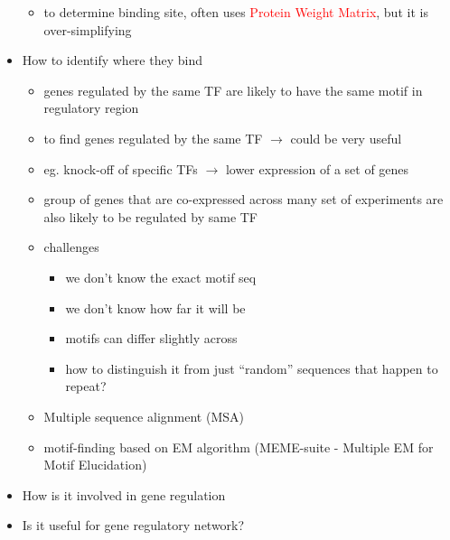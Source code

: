 \documentclass[font=12pt]{article}
\begin{document}
\begin{itemize}
\begin{itemize}
		\item to determine binding site, often uses \textcolor{red}{Protein Weight Matrix}, but it is over-simplifying
		\end{itemize}
	\item How to identify where they bind
		\begin{itemize}
			\item genes regulated by the same TF are likely to have the same motif in regulatory region
			\item to find genes regulated by the same TF $\rightarrow$  could be very useful
			\item eg. knock-off of specific TFs $\rightarrow$ lower expression of a set of genes
			\item group of genes that are co-expressed across many set of experiments are also likely to be regulated by same TF
			\item challenges
				\begin{itemize}
					\item we don't know the exact motif seq
					\item we don't know how far it will be
					\item motifs can differ slightly across
					\item how to distinguish it from just ``random'' sequences that happen to repeat?
				\end{itemize}
			\item Multiple sequence alignment (MSA)
			\item motif-finding based on EM algorithm (MEME-suite - Multiple EM for Motif Elucidation)
		\end{itemize}
	\item How is it involved in gene regulation
	\item Is it useful for gene regulatory network?
\end{itemize}
\end{document}
